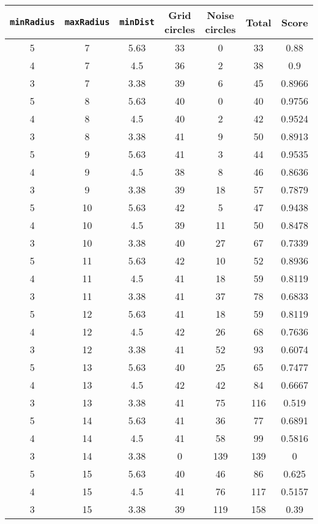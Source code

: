 \documentclass[letterpaper, 12pt]{article}
\begin{document}
\begin{longtable}{|c|c|c|c|c|c|c|}
\hline
\textbf{\texttt{minRadius}} & \textbf{\texttt{maxRadius}} & \textbf{\texttt{minDist}} & \textbf{Grid circles} & \textbf{Noise circles} & \textbf{Total} & \textbf{Score} \\
\hline
5 & 7 & 5.63 & 33 & 0 & 33 & 0.88 \\
\hline
4 & 7 & 4.5 & 36 & 2 & 38 & 0.9 \\
\hline
3 & 7 & 3.38 & 39 & 6 & 45 & 0.8966 \\
\hline
5 & 8 & 5.63 & 40 & 0 & 40 & 0.9756 \\
\hline
4 & 8 & 4.5 & 40 & 2 & 42 & 0.9524 \\
\hline
3 & 8 & 3.38 & 41 & 9 & 50 & 0.8913 \\
\hline
5 & 9 & 5.63 & 41 & 3 & 44 & 0.9535 \\
\hline
4 & 9 & 4.5 & 38 & 8 & 46 & 0.8636 \\
\hline
3 & 9 & 3.38 & 39 & 18 & 57 & 0.7879 \\
\hline
5 & 10 & 5.63 & 42 & 5 & 47 & 0.9438 \\
\hline
4 & 10 & 4.5 & 39 & 11 & 50 & 0.8478 \\
\hline
3 & 10 & 3.38 & 40 & 27 & 67 & 0.7339 \\
\hline
5 & 11 & 5.63 & 42 & 10 & 52 & 0.8936 \\
\hline
4 & 11 & 4.5 & 41 & 18 & 59 & 0.8119 \\
\hline
3 & 11 & 3.38 & 41 & 37 & 78 & 0.6833 \\
\hline
5 & 12 & 5.63 & 41 & 18 & 59 & 0.8119 \\
\hline
4 & 12 & 4.5 & 42 & 26 & 68 & 0.7636 \\
\hline
3 & 12 & 3.38 & 41 & 52 & 93 & 0.6074 \\
\hline
5 & 13 & 5.63 & 40 & 25 & 65 & 0.7477 \\
\hline
4 & 13 & 4.5 & 42 & 42 & 84 & 0.6667 \\
\hline
3 & 13 & 3.38 & 41 & 75 & 116 & 0.519 \\
\hline
5 & 14 & 5.63 & 41 & 36 & 77 & 0.6891 \\
\hline
4 & 14 & 4.5 & 41 & 58 & 99 & 0.5816 \\
\hline
3 & 14 & 3.38 & 0 & 139 & 139 & 0 \\
\hline
5 & 15 & 5.63 & 40 & 46 & 86 & 0.625 \\
\hline
4 & 15 & 4.5 & 41 & 76 & 117 & 0.5157 \\
\hline
3 & 15 & 3.38 & 39 & 119 & 158 & 0.39 \\

\end{longtable}
\end{document}

